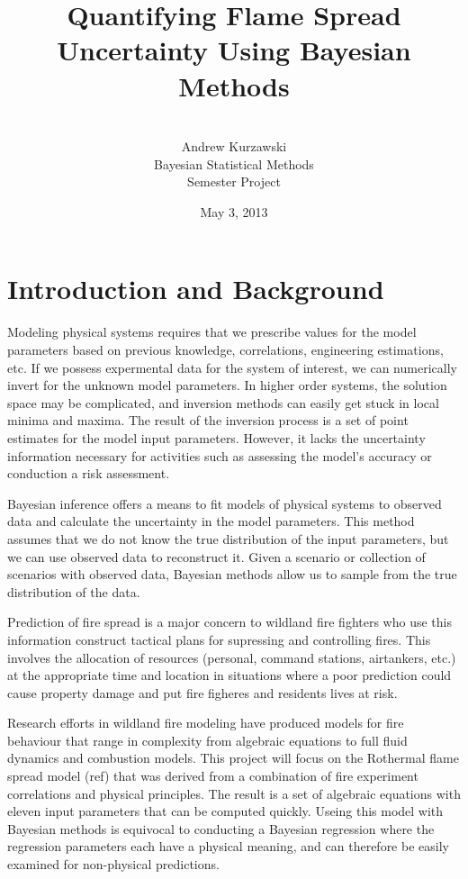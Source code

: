 \documentclass[11pt]{article}
\title{Quantifying Flame Spread Uncertainty Using Bayesian Methods}
\author{
        \\
        Andrew Kurzawski \\
        Bayesian Statistical Methods \\ 
        Semester Project \\
}
\date{May 3, 2013}
\begin{document}
\maketitle

\clearpage

\pagestyle{plain}


\section{Introduction and Background}

Modeling physical systems requires that we prescribe values for the model parameters based on previous knowledge, correlations, engineering estimations, etc. If we possess expermental data for the system of interest, we can numerically invert for the unknown model parameters. In higher order systems, the solution space may be complicated, and inversion methods can easily get stuck in local minima and maxima. The result of the inversion process is a set of point estimates for the model input parameters. However, it lacks the uncertainty information necessary for activities such as assessing the model's accuracy or conduction a risk assessment.

Bayesian inference offers a means to fit models of physical systems to observed data and calculate the uncertainty in the model parameters. This method assumes that we do not know the true distribution of the input parameters, but we can use observed data to reconstruct it. Given a scenario or collection of scenarios with observed data, Bayesian methods allow us to sample from the true distribution of the data.

Prediction of fire spread is a major concern to wildland fire fighters who use this information construct tactical plans for supressing and controlling fires. This involves the allocation of resources (personal, command stations, airtankers, etc.) at the appropriate time and location in situations where a poor prediction could cause property damage and put fire figheres and residents lives at risk.

Research efforts in wildland fire modeling have produced models for fire behaviour that range in complexity from algebraic equations to full fluid dynamics and combustion models. This project will focus on the Rothermal flame spread model (ref) that was derived from a combination of fire experiment correlations and physical principles. The result is a set of algebraic equations with eleven input parameters that can be computed quickly. Useing this model with Bayesian methods is equivocal to conducting a Bayesian regression where the regression parameters each have a physical meaning, and can therefore be easily examined for non-physical predictions.
\end{document}
